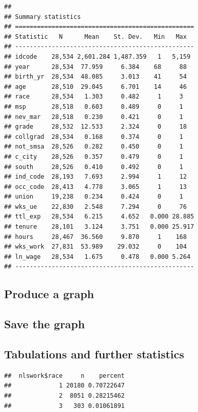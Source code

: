 \documentclass[
]{article}
\begin{document}
\begin{verbatim}
## 
## Summary statistics
## =================================================
## Statistic   N      Mean    St. Dev.   Min   Max  
## -------------------------------------------------
## idcode    28,534 2,601.284 1,487.359   1   5,159 
## year      28,534  77.959     6.384    68     88  
## birth_yr  28,534  48.085     3.013    41     54  
## age       28,510  29.045     6.701    14     46  
## race      28,534   1.303     0.482     1     3   
## msp       28,518   0.603     0.489     0     1   
## nev_mar   28,518   0.230     0.421     0     1   
## grade     28,532  12.533     2.324     0     18  
## collgrad  28,534   0.168     0.374     0     1   
## not_smsa  28,526   0.282     0.450     0     1   
## c_city    28,526   0.357     0.479     0     1   
## south     28,526   0.410     0.492     0     1   
## ind_code  28,193   7.693     2.994     1     12  
## occ_code  28,413   4.778     3.065     1     13  
## union     19,238   0.234     0.424     0     1   
## wks_ue    22,830   2.548     7.294     0     76  
## ttl_exp   28,534   6.215     4.652   0.000 28.885
## tenure    28,101   3.124     3.751   0.000 25.917
## hours     28,467  36.560     9.870     1    168  
## wks_work  27,831  53.989    29.032     0    104  
## ln_wage   28,534   1.675     0.478   0.000 5.264 
## -------------------------------------------------
\end{verbatim}

\hypertarget{produce-a-graph}{%
\subsection{Produce a graph}\label{produce-a-graph}}

\hypertarget{save-the-graph}{%
\subsection{Save the graph}\label{save-the-graph}}

\hypertarget{tabulations-and-further-statistics}{%
\subsection{Tabulations and further
statistics}\label{tabulations-and-further-statistics}}

\begin{verbatim}
##  nlswork$race     n    percent
##             1 20180 0.70722647
##             2  8051 0.28215462
##             3   303 0.01061891
\end{verbatim}
\end{document}
